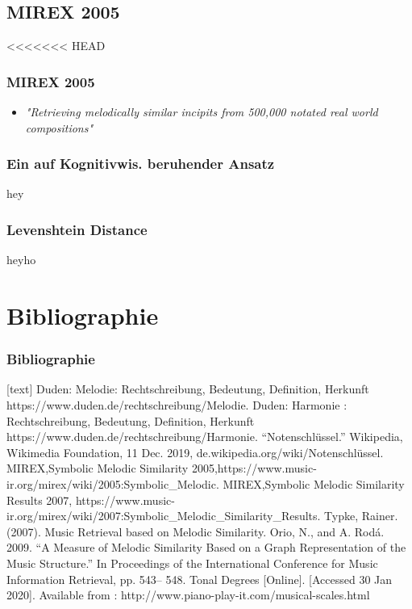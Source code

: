 \documentclass{beamer}
\begin{document}
	\subsection{MIREX 2005}

<<<<<<< HEAD
	\begin{frame}
		\frametitle{MIREX 2005}
		\begin{itemize}
			\item \textit{"Retrieving melodically similar incipits from 500,000 notated real world compositions"}\cite{mirex_website}
		\end{itemize}
	\end{frame}

	\subsubsection{Ein auf Kognitivwis. beruhender Ansatz}
		
		\begin{frame}
			hey
		\end{frame}
	\subsubsection{Levenshtein Distance}
		\begin{frame}
			heyho
		\end{frame}


	\section{Bibliographie}

		\begin{frame}[allowframebreaks]
			\frametitle{Bibliographie}
			\begin{thebibliography}{5}
				[text]
				 Duden: Melodie: Rechtschreibung, Bedeutung, Definition, Herkunft
				https://www.duden.de/rechtschreibung/Melodie.
				 Duden: Harmonie : Rechtschreibung, Bedeutung, Definition, Herkunft
				https://www.duden.de/rechtschreibung/Harmonie.
				 “Notenschlüssel.” Wikipedia, Wikimedia Foundation, 11 Dec. 2019, de.wikipedia.org/wiki/Notenschlüssel.
				 MIREX,Symbolic Melodic Similarity 2005,https://www.music-ir.org/mirex/wiki/2005:Symbolic\_Melodic.
				 MIREX,Symbolic Melodic Similarity Results 2007, https://www.music-ir.org/mirex/wiki/2007:Symbolic\_Melodic\_Similarity\_Results.
				 Typke, Rainer. (2007). Music Retrieval based on Melodic Similarity.
				 Orio, N., and A. Rodá. 2009. “A Measure of Melodic Similarity Based on a Graph Representation of the Music Structure.” In Proceedings of the International Conference for Music Information Retrieval, pp. 543– 548.
				 Tonal Degrees [Online]. [Accessed 30 Jan 2020]. Available from : http://www.piano-play-it.com/musical-scales.html
			\end{thebibliography}
		\end{frame}
\end{document}
